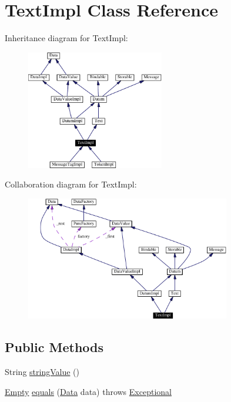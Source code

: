 \hypertarget{classTextImpl}{
\section{Text\-Impl  Class Reference}
\label{classTextImpl}
}
Inheritance diagram for Text\-Impl:\begin{figure}[H]
\begin{center}
\leavevmode
\includegraphics[width=170pt]{classTextImpl__inherit__graph}
\end{center}
\end{figure}
Collaboration diagram for Text\-Impl:\begin{figure}[H]
\begin{center}
\leavevmode
\includegraphics[width=253pt]{classTextImpl__coll__graph}
\end{center}
\end{figure}
\subsection*{Public Methods}
\begin{CompactItemize}
\item 
String \hyperlink{classTextImpl_a0}{string\-Value} ()
\item 
\hyperlink{interfaceEmpty}{Empty} \hyperlink{classTextImpl_a1}{equals} (\hyperlink{interfaceData}{Data} data) throws \hyperlink{classExceptional}{Exceptional}
\end{CompactItemize}


